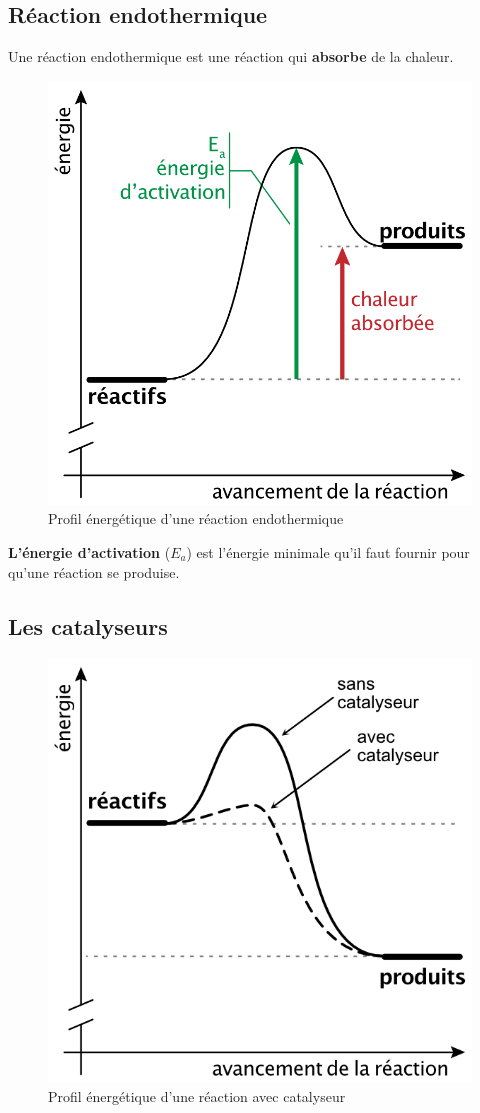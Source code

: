 \documentclass[
  11pt,
  a4paper,
  openany]{book}
\begin{document}
\hypertarget{ruxe9action-endothermique}{%
\subsection{Réaction endothermique}\label{ruxe9action-endothermique}}

Une réaction endothermique est une réaction qui \textbf{absorbe} de la chaleur.

\begin{figure}

{\centering \includegraphics[width=0.33\linewidth]{images/chaleur-2} 

}

\caption{Profil énergétique d'une réaction endothermique}\label{fig:chaleur-2}
\end{figure}

\textbf{L'énergie d'activation} (\(E_a\)) est l'énergie minimale qu'il faut fournir pour qu'une réaction se produise.

\hypertarget{les-catalyseurs}{%
\subsection{Les catalyseurs}\label{les-catalyseurs}}

\begin{figure}

{\centering \includegraphics[width=0.33\linewidth]{images/catalyseur} 

}

\caption{Profil énergétique d'une réaction avec catalyseur}\label{fig:catalyseur}
\end{figure}
\end{document}
